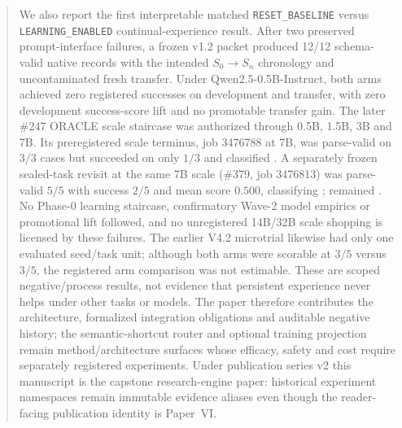 \documentclass[11pt]{article}
\begin{document}
\begin{abstract}
We also report the first interpretable matched \texttt{RESET\_BASELINE} versus \texttt{LEARNING\_ENABLED} continual-experience result. After two preserved prompt-interface failures, a frozen v1.2 packet produced 12/12 schema-valid native records with the intended $S_0\rightarrow S_n$ chronology and uncontaminated fresh transfer. Under Qwen2.5-0.5B-Instruct, both arms achieved zero registered successes on development and transfer, with zero development success-score lift and no promotable transfer gain. The later \#247 ORACLE scale staircase was authorized through 0.5B, 1.5B, 3B and 7B. Its preregistered scale terminus, job 3476788 at 7B, was parse-valid on $3/3$ cases but succeeded on only $1/3$ and classified . A separately frozen sealed-task revisit at the same 7B scale (\#379, job 3476813) was parse-valid $5/5$ with success $2/5$ and mean score $0.500$, classifying ;  remained . No Phase-0 learning staircase, confirmatory Wave-2 model empirics or promotional lift followed, and no unregistered 14B/32B scale shopping is licensed by these failures. The earlier V4.2 microtrial likewise had only one evaluated seed/task unit; although both arms were scorable at $3/5$ versus $3/5$, the registered arm comparison was not estimable. These are scoped negative/process results, not evidence that persistent experience never helps under other tasks or models. The paper therefore contributes the architecture, formalized integration obligations and auditable negative history; the semantic-shortcut router and optional training projection remain method/architecture surfaces whose efficacy, safety and cost require separately registered experiments. Under publication series v2 this manuscript is the capstone research-engine paper: historical  experiment namespaces remain immutable evidence aliases even though the reader-facing publication identity is Paper~VI.
\end{abstract}
\end{document}
